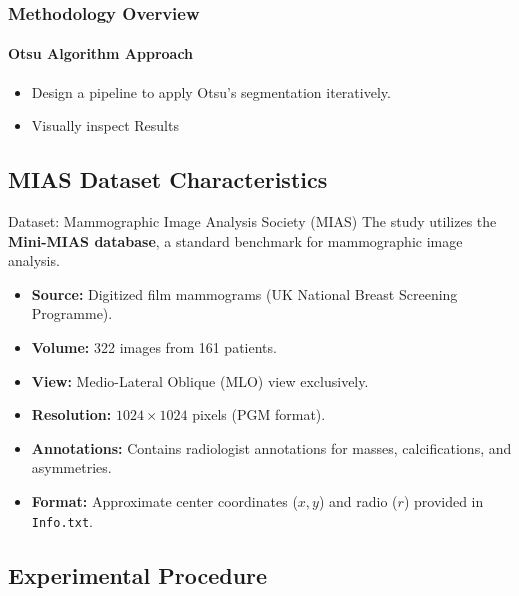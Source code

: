 \documentclass{beamer}
\begin{document}
\begin{frame}
  \frametitle{Methodology Overview}
  \framesubtitle{Otsu Algorithm Approach}

          \begin{itemize}
        \item Design a pipeline to apply Otsu's segmentation
          iteratively.
        \item Visually inspect Results
        \end{itemize}
\end{frame}

\subsection{MIAS Dataset Characteristics}


\begin{frame}{Dataset: Mammographic Image Analysis Society (MIAS)}
    The study utilizes the \textbf{Mini-MIAS database}, a standard benchmark for mammographic image analysis.


        \begin{itemize}
            \item \textbf{Source:} Digitized film mammograms (UK National Breast Screening Programme).
            \item \textbf{Volume:} 322 images from 161 patients.
            \item \textbf{View:} Medio-Lateral Oblique (MLO) view exclusively.
            \item \textbf{Resolution:} $1024 \times 1024$ pixels (PGM format).
            \item \textbf{Annotations:} Contains radiologist annotations for masses, calcifications, and asymmetries.
            \item \textbf{Format:} Approximate center coordinates ($x, y$) and radio ($r$) provided in \texttt{Info.txt}.
        \end{itemize}

\end{frame}


\subsection{Experimental Procedure}
\end{document}
